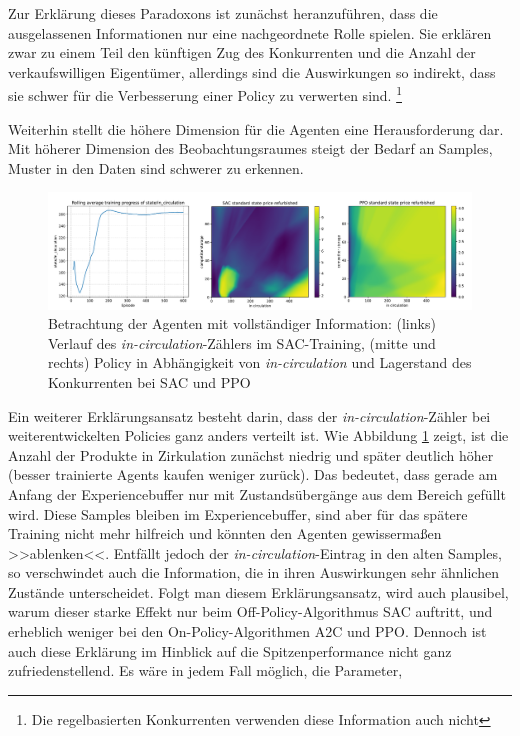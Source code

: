 Zur Erklärung dieses Paradoxons ist zunächst heranzuführen, dass die ausgelassenen Informationen nur eine nachgeordnete Rolle spielen.
Sie erklären zwar zu einem Teil den künftigen Zug des Konkurrenten und die Anzahl der verkaufswilligen Eigentümer, allerdings sind die Auswirkungen so indirekt, dass sie schwer für die Verbesserung einer Policy zu verwerten sind. \footnote{Die regelbasierten Konkurrenten verwenden diese Information auch nicht}

Weiterhin stellt die höhere Dimension für die Agenten eine Herausforderung dar.
Mit höherer Dimension des Beobachtungsraumes steigt der Bedarf an Samples, Muster in den Daten sind schwerer zu erkennen.
\begin{figure}[htbp]
	\centering
	\includegraphics[width=\textwidth]{main/sac_in_circulation_dependend_explanation.pdf}
	\caption{Betrachtung der Agenten mit vollständiger Information: (links) Verlauf des \textit{in-circulation}-Zählers im SAC-Training, (mitte und rechts) Policy in Abhängigkeit von \textit{in-circulation} und Lagerstand des Konkurrenten bei SAC und PPO}
	\label{grafic:InCirculationExplain}
\end{figure}
Ein weiterer Erklärungsansatz besteht darin, dass der \textit{in-circulation}-Zähler bei weiterentwickelten Policies ganz anders verteilt ist.
Wie Abbildung \ref{grafic:InCirculationExplain} zeigt, ist die Anzahl der Produkte in Zirkulation zunächst niedrig und später deutlich höher (besser trainierte Agents kaufen weniger zurück).
Das bedeutet, dass gerade am Anfang der Experiencebuffer nur mit Zustandsübergänge aus dem Bereich gefüllt wird.
Diese Samples bleiben im Experiencebuffer, sind aber für das spätere Training nicht mehr hilfreich und könnten den Agenten gewissermaßen >>ablenken<<.
Entfällt jedoch der \textit{in-circulation}-Eintrag in den alten Samples, so verschwindet auch die Information, die in ihren Auswirkungen sehr ähnlichen Zustände unterscheidet.
Folgt man diesem Erklärungsansatz, wird auch plausibel, warum dieser starke Effekt nur beim Off-Policy-Algorithmus SAC auftritt, und erheblich weniger bei den On-Policy-Algorithmen A2C und PPO.
Dennoch ist auch diese Erklärung im Hinblick auf die Spitzenperformance nicht ganz zufriedenstellend.
Es wäre in jedem Fall möglich, die Parameter, 

